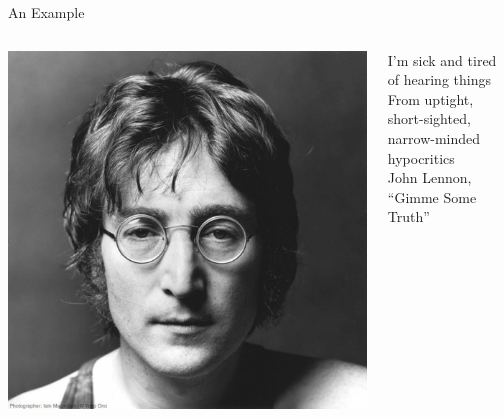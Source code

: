 \documentclass[
  17pt,
  letterpaper,
  ignorenonframetext,
  aspectratio=169,
  handout]{beamer}
\begin{document}
\begin{frame}{An Example}
\protect\hypertarget{an-example}{}
\begin{columns}[T]
\begin{column}{0.48\textwidth}
\includegraphics[width=\textwidth,height=0.7\textheight]{../images/lennon.jpeg}
\end{column}

\begin{column}{0.48\textwidth}
I'm sick and tired\\
\hspace*{0.333em}\hspace*{0.333em}of hearing things\\
From uptight, short-sighted,\\
\hspace*{0.333em}\hspace*{0.333em}narrow-minded hypocritics\\
\hspace*{0.333em}\hspace*{0.333em}\hspace*{0.333em}\hspace*{0.333em}\hspace*{0.333em}\hspace*{0.333em}\hspace*{0.333em}John
Lennon,\\
\hspace*{0.333em}\hspace*{0.333em}\hspace*{0.333em}\hspace*{0.333em}\hspace*{0.333em}\hspace*{0.333em}\hspace*{0.333em}``Gimme
Some Truth''
\end{column}
\end{columns}
\end{frame}
\end{document}
